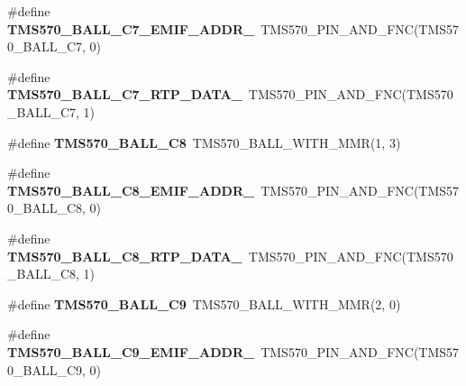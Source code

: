 \begin{DoxyCompactItemize}
\item 
\mbox{\label{tms570lc4357-pins_8h_af4e8e97bf15341f3838d8f90f7226e02}} 
\#define {\bfseries T\+M\+S570\+\_\+\+B\+A\+L\+L\+\_\+\+C7\+\_\+\+E\+M\+I\+F\+\_\+\+A\+D\+D\+R\+\_}~T\+M\+S570\+\_\+\+P\+I\+N\+\_\+\+A\+N\+D\+\_\+\+F\+NC(T\+M\+S570\+\_\+\+B\+A\+L\+L\+\_\+\+C7, 0)
\item 
\mbox{\label{tms570lc4357-pins_8h_a168fb63cf511f04c27ad2e13e8cd83b6}} 
\#define {\bfseries T\+M\+S570\+\_\+\+B\+A\+L\+L\+\_\+\+C7\+\_\+\+R\+T\+P\+\_\+\+D\+A\+T\+A\+\_}~T\+M\+S570\+\_\+\+P\+I\+N\+\_\+\+A\+N\+D\+\_\+\+F\+NC(T\+M\+S570\+\_\+\+B\+A\+L\+L\+\_\+\+C7, 1)
\item 
\mbox{\label{tms570lc4357-pins_8h_a15a484a467d48395e6d84a888961e6a5}} 
\#define {\bfseries T\+M\+S570\+\_\+\+B\+A\+L\+L\+\_\+\+C8}~T\+M\+S570\+\_\+\+B\+A\+L\+L\+\_\+\+W\+I\+T\+H\+\_\+\+M\+MR(1, 3)
\item 
\mbox{\label{tms570lc4357-pins_8h_ac7d8a45231cb9917e2e48f52920dba1f}} 
\#define {\bfseries T\+M\+S570\+\_\+\+B\+A\+L\+L\+\_\+\+C8\+\_\+\+E\+M\+I\+F\+\_\+\+A\+D\+D\+R\+\_}~T\+M\+S570\+\_\+\+P\+I\+N\+\_\+\+A\+N\+D\+\_\+\+F\+NC(T\+M\+S570\+\_\+\+B\+A\+L\+L\+\_\+\+C8, 0)
\item 
\mbox{\label{tms570lc4357-pins_8h_aa635fc133ea9ad96a6b9f09dfc61ecfb}} 
\#define {\bfseries T\+M\+S570\+\_\+\+B\+A\+L\+L\+\_\+\+C8\+\_\+\+R\+T\+P\+\_\+\+D\+A\+T\+A\+\_}~T\+M\+S570\+\_\+\+P\+I\+N\+\_\+\+A\+N\+D\+\_\+\+F\+NC(T\+M\+S570\+\_\+\+B\+A\+L\+L\+\_\+\+C8, 1)
\item 
\mbox{\label{tms570lc4357-pins_8h_a439fad701bbeb55d085572493d9f711e}} 
\#define {\bfseries T\+M\+S570\+\_\+\+B\+A\+L\+L\+\_\+\+C9}~T\+M\+S570\+\_\+\+B\+A\+L\+L\+\_\+\+W\+I\+T\+H\+\_\+\+M\+MR(2, 0)
\item 
\mbox{\label{tms570lc4357-pins_8h_a2c86e0b24ea9f17646dff73db970ebb1}} 
\#define {\bfseries T\+M\+S570\+\_\+\+B\+A\+L\+L\+\_\+\+C9\+\_\+\+E\+M\+I\+F\+\_\+\+A\+D\+D\+R\+\_}~T\+M\+S570\+\_\+\+P\+I\+N\+\_\+\+A\+N\+D\+\_\+\+F\+NC(T\+M\+S570\+\_\+\+B\+A\+L\+L\+\_\+\+C9, 0)
\item 

\end{DoxyCompactItemize}
